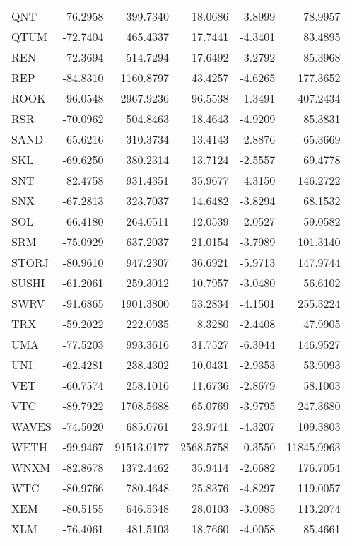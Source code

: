 \begin{table}[ht]
\begin{tabular}{lrrrrr}
QNT & -76.2958 & 399.7340 & 18.0686 & -3.8999 & 78.9957 \\
QTUM & -72.7404 & 465.4337 & 17.7441 & -4.3401 & 83.4895 \\
REN & -72.3694 & 514.7294 & 17.6492 & -3.2792 & 85.3968 \\
REP & -84.8310 & 1160.8797 & 43.4257 & -4.6265 & 177.3652 \\
ROOK & -96.0548 & 2967.9236 & 96.5538 & -1.3491 & 407.2434 \\
RSR & -70.0962 & 504.8463 & 18.4643 & -4.9209 & 85.3831 \\
SAND & -65.6216 & 310.3734 & 13.4143 & -2.8876 & 65.3669 \\
SKL & -69.6250 & 380.2314 & 13.7124 & -2.5557 & 69.4778 \\
SNT & -82.4758 & 931.4351 & 35.9677 & -4.3150 & 146.2722 \\
SNX & -67.2813 & 323.7037 & 14.6482 & -3.8294 & 68.1532 \\
SOL & -66.4180 & 264.0511 & 12.0539 & -2.0527 & 59.0582 \\
SRM & -75.0929 & 637.2037 & 21.0154 & -3.7989 & 101.3140 \\
STORJ & -80.9610 & 947.2307 & 36.6921 & -5.9713 & 147.9744 \\
SUSHI & -61.2061 & 259.3012 & 10.7957 & -3.0480 & 56.6102 \\
SWRV & -91.6865 & 1901.3800 & 53.2834 & -4.1501 & 255.3224 \\
TRX & -59.2022 & 222.0935 & 8.3280 & -2.4408 & 47.9905 \\
UMA & -77.5203 & 993.3616 & 31.7527 & -6.3944 & 146.9527 \\
UNI & -62.4281 & 238.4302 & 10.0431 & -2.9353 & 53.9093 \\
VET & -60.7574 & 258.1016 & 11.6736 & -2.8679 & 58.1003 \\
VTC & -89.7922 & 1708.5688 & 65.0769 & -3.9795 & 247.3680 \\
WAVES & -74.5020 & 685.0761 & 23.9741 & -4.3207 & 109.3803 \\
WETH & -99.9467 & 91513.0177 & 2568.5758 & 0.3550 & 11845.9963 \\
WNXM & -82.8678 & 1372.4462 & 35.9414 & -2.6682 & 176.7054 \\
WTC & -80.9766 & 780.4648 & 25.8376 & -4.8297 & 119.0057 \\
XEM & -80.5155 & 646.5348 & 28.0103 & -3.0985 & 113.2074 \\
XLM & -76.4061 & 481.5103 & 18.7660 & -4.0058 & 85.4661 \\

\end{tabular}
\end{table}
